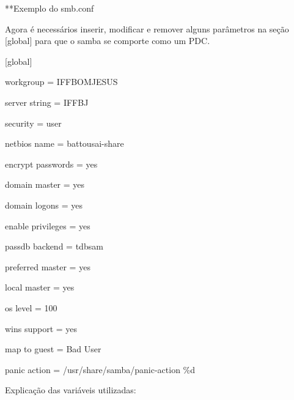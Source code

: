 **Exemplo do smb.conf

Agora é necessários inserir, modificar e remover alguns parâmetros na seção [global] para que o samba se comporte como um PDC.
{\raggedright

[global] 

	workgroup = IFFBOMJESUS 

	server string = IFFBJ        

	security = user

	netbios name = battousai-share

	encrypt passwords = yes

	domain master = yes

	domain logons = yes

	enable privileges = yes

	passdb backend = tdbsam

	preferred master = yes

	local master = yes

	os level = 100

	wins support = yes

	map to guest = Bad User

	panic action = /usr/share/samba/panic-action \%d
}

Explicação das variáveis utilizadas:

